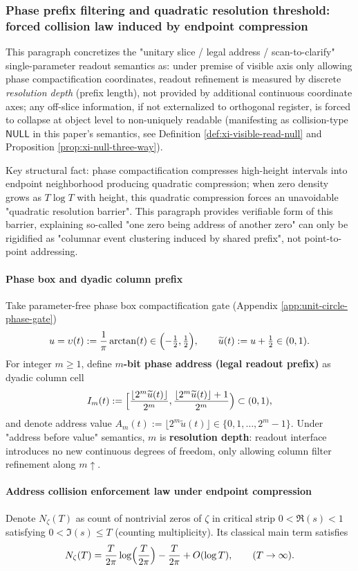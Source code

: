 \subsubsection{Phase prefix filtering and quadratic resolution threshold: forced collision law induced by endpoint compression}\label{subsubsec:xi-phase-prefix-resolution-law}
This paragraph concretizes the "unitary slice / legal address / scan-to-clarify" single-parameter readout semantics as: under premise of visible axis only allowing phase compactification coordinates, readout refinement is measured by discrete \emph{resolution depth} (prefix length), not provided by additional continuous coordinate axes; any off-slice information, if not externalized to orthogonal register, is forced to collapse at object level to non-uniquely readable (manifesting as collision-type \(\mathsf{NULL}\) in this paper's semantics, see Definition \ref{def:xi-visible-read-null} and Proposition \ref{prop:xi-null-three-way}).
\par
Key structural fact: phase compactification compresses high-height intervals into endpoint neighborhood producing quadratic compression; when zero density grows as \(T\log T\) with height, this quadratic compression forces an unavoidable "quadratic resolution barrier". This paragraph provides verifiable form of this barrier, explaining so-called "one zero being address of another zero" can only be rigidified as "columnar event clustering induced by shared prefix", not point-to-point addressing.

\paragraph{Phase box and dyadic column prefix}
Take parameter-free phase box compactification gate (Appendix \ref{app:unit-circle-phase-gate})
\[
u=\upsilon(t):=\frac{1}{\pi}\arctan(t)\in\Bigl(-\tfrac12,\tfrac12\Bigr),
\qquad
\widetilde u(t):=u+\tfrac12\in(0,1).
\]
For integer \(m\ge 1\), define \textbf{\(m\)-bit phase address (legal readout prefix)} as dyadic column cell
\[
I_m(t):=\Bigl[\frac{\lfloor 2^m\widetilde u(t)\rfloor}{2^m},\frac{\lfloor 2^m\widetilde u(t)\rfloor+1}{2^m}\Bigr)\subset(0,1),
\]
and denote address value
\(
A_m(t):=\lfloor 2^m\widetilde u(t)\rfloor\in\{0,1,\dots,2^m-1\}.
\)
Under "address before value" semantics, \(m\) is \textbf{resolution depth}: readout interface introduces no new continuous degrees of freedom, only allowing column filter refinement along \(m\uparrow\).

\paragraph{Address collision enforcement law under endpoint compression}
Denote \(N_\zeta(T)\) as count of nontrivial zeros of \(\zeta\) in critical strip \(0<\Re(s)<1\) satisfying \(0<\Im(s)\le T\) (counting multiplicity). Its classical main term satisfies
\[
N_\zeta(T)=\frac{T}{2\pi}\log\Bigl(\frac{T}{2\pi}\Bigr)-\frac{T}{2\pi}+O(\log T),
\qquad(T\to\infty).
\]

